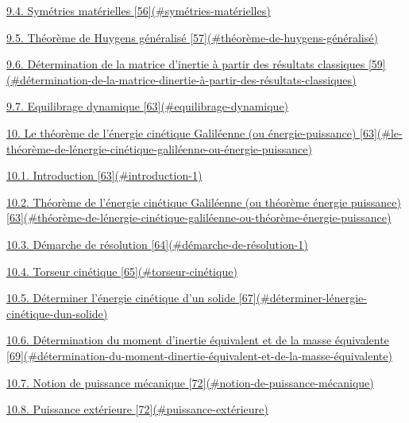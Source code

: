 \protect\hyperlink{symuxe9tries-matuxe9rielles}{9.4. Symétries matérielles {[}56{]}(\#symétries-matérielles)}

\protect\hyperlink{thuxe9oruxe8me-de-huygens-guxe9nuxe9ralisuxe9}{9.5. Théorème de Huygens généralisé {[}57{]}(\#théorème-de-huygens-généralisé)}

\protect\hyperlink{duxe9termination-de-la-matrice-dinertie-uxe0-partir-des-ruxe9sultats-classiques}{9.6. Détermination de la matrice d'inertie à partir des résultats classiques {[}59{]}(\#détermination-de-la-matrice-dinertie-à-partir-des-résultats-classiques)}

\protect\hyperlink{equilibrage-dynamique}{9.7. Equilibrage dynamique {[}63{]}(\#equilibrage-dynamique)}

\protect\hyperlink{le-thuxe9oruxe8me-de-luxe9nergie-cinuxe9tique-galiluxe9enne-ou-uxe9nergie-puissance}{10. Le théorème de l'énergie cinétique Galiléenne (ou énergie-puissance) {[}63{]}(\#le-théorème-de-lénergie-cinétique-galiléenne-ou-énergie-puissance)}

\protect\hyperlink{introduction-1}{10.1. Introduction {[}63{]}(\#introduction-1)}

\protect\hyperlink{thuxe9oruxe8me-de-luxe9nergie-cinuxe9tique-galiluxe9enne-ou-thuxe9oruxe8me-uxe9nergie-puissance}{10.2. Théorème de l'énergie cinétique Galiléenne (ou théorème énergie puissance) {[}63{]}(\#théorème-de-lénergie-cinétique-galiléenne-ou-théorème-énergie-puissance)}

\protect\hyperlink{duxe9marche-de-ruxe9solution-1}{10.3. Démarche de résolution {[}64{]}(\#démarche-de-résolution-1)}

\protect\hyperlink{torseur-cinuxe9tique}{10.4. Torseur cinétique {[}65{]}(\#torseur-cinétique)}

\protect\hyperlink{duxe9terminer-luxe9nergie-cinuxe9tique-dun-solide}{10.5. Déterminer l'énergie cinétique d'un solide {[}67{]}(\#déterminer-lénergie-cinétique-dun-solide)}

\protect\hyperlink{duxe9termination-du-moment-dinertie-uxe9quivalent-et-de-la-masse-uxe9quivalente}{10.6. Détermination du moment d'inertie équivalent et de la masse équivalente {[}69{]}(\#détermination-du-moment-dinertie-équivalent-et-de-la-masse-équivalente)}

\protect\hyperlink{notion-de-puissance-muxe9canique}{10.7. Notion de puissance mécanique {[}72{]}(\#notion-de-puissance-mécanique)}

\protect\hyperlink{puissance-extuxe9rieure}{10.8. Puissance extérieure {[}72{]}(\#puissance-extérieure)}

